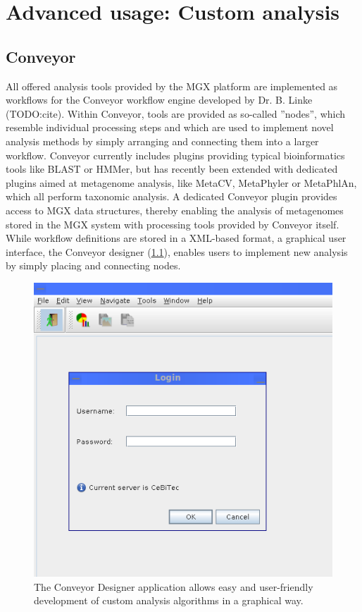 
\chapter{Advanced usage: Custom analysis}
\label{custom}

\section{Conveyor}

All offered analysis tools provided by the MGX platform are implemented as workflows
for the Conveyor workflow engine developed by Dr. B. Linke (TODO:cite). Within Conveyor,
tools are provided as so-called ''nodes'', which resemble individual processing steps
and which are used to implement novel analysis methods by simply arranging and connecting
them into a larger workflow. Conveyor currently includes plugins providing typical
bioinformatics tools like BLAST or HMMer, but has recently been extended with dedicated
plugins aimed at metagenome analysis, like MetaCV, MetaPhyler or MetaPhlAn, which all
perform taxonomic analysis.
A dedicated Conveyor plugin provides access to MGX data structures, thereby enabling the
analysis of metagenomes stored in the MGX system with processing tools provided by Conveyor
itself.
While workflow definitions are stored in a XML-based format, a graphical user interface,
the Conveyor designer (\ref{designer}), enables users to implement new analysis by simply
placing and connecting nodes.

\begin{figure}[ht]
\centering
\includegraphics[width=.8\textwidth]{img/login-screen}
\caption['Conveyor Designer]{The Conveyor Designer application allows easy and user-friendly
development of custom analysis algorithms in a graphical way.}
\label{designer}
\end{figure}


